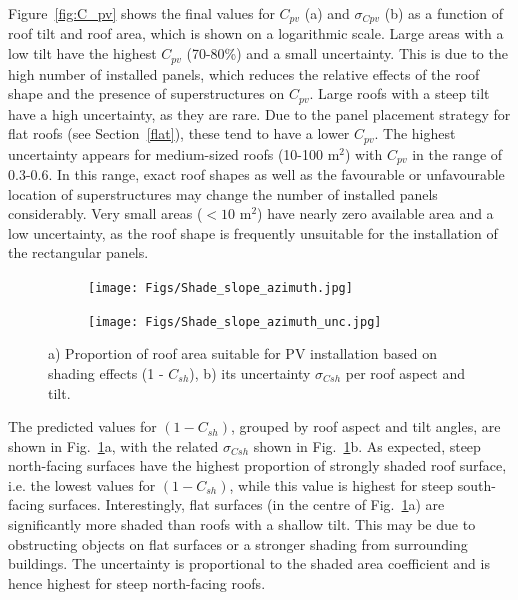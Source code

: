 Figure~\ref{fig:C_pv} shows the final values for $C_{\mathit{pv}}$ (a) and $\sigma_{\mathit{Cpv}}$ (b) as a function of roof tilt and roof area, which is shown on a logarithmic scale. 
Large areas with a low tilt have the highest $C_{\mathit{pv}}$ (70-80\%) and a small uncertainty.
This is due to the high number of installed panels, which reduces the relative effects of the roof shape and the presence of superstructures on $C_{\mathit{pv}}$. Large roofs with a steep tilt have a high uncertainty, as they are rare.
Due to the panel placement strategy for flat roofs (see Section~\ref{flat}), these tend to have a lower $C_{\mathit{pv}}$. 
The highest uncertainty appears for medium-sized roofs (10-100 m$^2$) with $C_{\mathit{pv}}$ in the range of 0.3-0.6. In this range, exact roof shapes as well as the favourable or unfavourable location of superstructures may change the number of installed panels considerably.
Very small areas ($< 10$ m$^2$) have nearly zero available area and a low uncertainty, as the roof shape is frequently unsuitable for the installation of the rectangular panels.

\begin{figure}[tb]
\centering
\begin{subfigure}{.49\textwidth}
  \centering
  \texttt{[image: Figs/Shade\_slope\_azimuth.jpg]}
  \subcaption{}
\end{subfigure}
\begin{subfigure}{.49\textwidth}
  \centering
  \texttt{[image: Figs/Shade\_slope\_azimuth\_unc.jpg]}  
  \subcaption{}
\end{subfigure}
\caption{a) Proportion of roof area suitable for PV installation based on shading effects (1 - $C_{sh}$), b) its uncertainty $\sigma_{\mathit{Csh}}$ per roof aspect and tilt.}
\label{fig:Csh}
\end{figure}

The predicted values for $(1-C_{sh})$, grouped by roof aspect and tilt angles, are shown in Fig.~\ref{fig:Csh}a, with the related $\sigma_{\mathit{Csh}}$ shown in Fig.~\ref{fig:Csh}b. 
As expected, steep north-facing surfaces have the highest proportion of strongly shaded roof surface, i.e. the lowest values for $(1-C_{sh})$, while this value is highest for steep south-facing surfaces. 
Interestingly, flat surfaces (in the centre of  Fig.~\ref{fig:Csh}a) are significantly more shaded than roofs with a shallow tilt. This may be due to obstructing objects on flat surfaces or a stronger shading from surrounding buildings. 
The uncertainty is proportional to the shaded area coefficient and is hence highest for steep north-facing roofs. 

